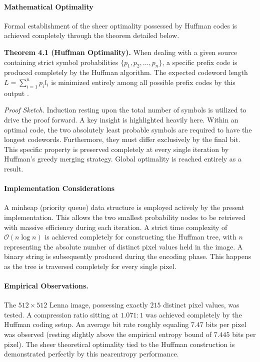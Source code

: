 \paragraph{Mathematical Optimality}

Formal establishment of the sheer optimality possessed by Huffman codes is achieved completely through the theorem detailed below.

\vspace{0.5em}\noindent
\textbf{Theorem 4.1 (Huffman Optimality).} When dealing with a given source containing strict symbol probabilities $\{p_1, p_2, \dots, p_n\}$, a specific prefix code is produced completely by the Huffman algorithm. The expected codeword length $L = \sum_{i=1}^{n} p_i l_i$ is minimized entirely among all possible prefix codes by this output \cite{Huffman1952}.

\vspace{0.5em}\noindent
\textit{Proof Sketch.} Induction resting upon the total number of symbols is utilized to drive the proof forward. A key insight is highlighted heavily here. Within an optimal code, the two absolutely least probable symbols are required to have the longest codewords. Furthermore, they must differ exclusively by the final bit. This specific property is preserved completely at every single iteration by Huffman's greedy merging strategy. Global optimality is reached entirely as a result.

\paragraph{Implementation Considerations}

A minheap (priority queue) data structure is employed actively by the present implementation. This allows the two smallest probability nodes to be retrieved with massive efficiency during each iteration. A strict time complexity of $\mathcal{O}(n \log n)$ is achieved completely for constructing the Huffman tree, with $n$ representing the absolute number of distinct pixel values held in the image. A binary string is subsequently produced during the encoding phase. This happens as the tree is traversed completely for every single pixel.

\paragraph{Empirical Observations.} The $512 \times 512$ Lenna image, possessing exactly $215$ distinct pixel values, was tested. A compression ratio sitting at $1.071:1$ was achieved completely by the Huffman coding setup. An average bit rate roughly equaling $7.47$ bits per pixel was observed (resting slightly above the empirical entropy bound of $7.445$ bits per pixel). The sheer theoretical optimality tied to the Huffman construction is demonstrated perfectly by this nearentropy performance.


